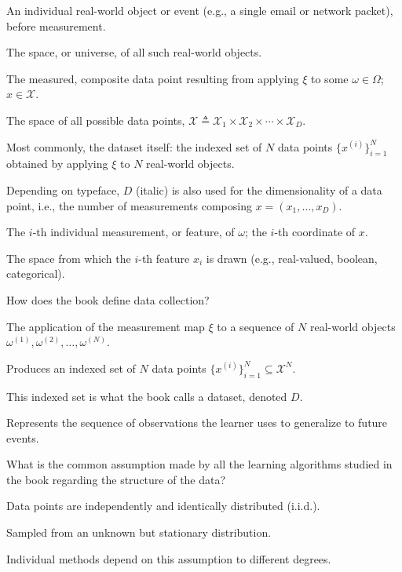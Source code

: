 \documentclass[10pt]{extarticle}
\newcommand{\resposta}[1]{\par\smallskip\noindent #1}
\begin{document}
\begin{questoes}
\resposta{
\begin{topicos}
\item[$\omega$:] An individual real-world object or event (e.g., a single email or network packet), before measurement.
\item[$\Omega$:] The space, or universe, of all such real-world objects.
\item[$x$:] The measured, composite data point resulting from applying $\xi$ to some $\omega \in \Omega$; $x \in \mathcal{X}$.
\item[$\mathcal{X}$:] The space of all possible data points, $\mathcal{X} \triangleq \mathcal{X}_1 \times \mathcal{X}_2 \times \cdots \times \mathcal{X}_D$.
\item[$D$:] Most commonly, the dataset itself: the indexed set of $N$ data points $\{x^{(i)}\}_{i=1}^{N}$ obtained by applying $\xi$ to $N$ real-world objects.
\item[] Depending on typeface, $D$ (italic) is also used for the dimensionality of a data point, i.e., the number of measurements composing $x = (x_1,\ldots,x_D)$.
\item[$x_i$:] The $i$-th individual measurement, or feature, of $\omega$; the $i$-th coordinate of $x$.
\item[$\mathcal{X}_i$:] The space from which the $i$-th feature $x_i$ is drawn (e.g., real-valued, boolean, categorical).
\end{topicos}
}

\item How does the book define data collection?

\resposta{
\begin{topicos}
\item The application of the measurement map $\xi$ to a sequence of $N$ real-world objects $\omega^{(1)}, \omega^{(2)}, \ldots, \omega^{(N)}$.
\item Produces an indexed set of $N$ data points $\{x^{(i)}\}_{i=1}^{N} \subseteq \mathcal{X}^N$.
\item This indexed set is what the book calls a dataset, denoted $D$.
\item Represents the sequence of observations the learner uses to generalize to future events.
\end{topicos}
}

\item What is the common assumption made by all the learning algorithms studied in the book regarding the structure of the data?

\resposta{
\begin{topicos}
\item Data points are independently and identically distributed (i.i.d.).
\item Sampled from an unknown but stationary distribution.
\item Individual methods depend on this assumption to different degrees.
\end{topicos}
}


\end{questoes}
\end{document}
